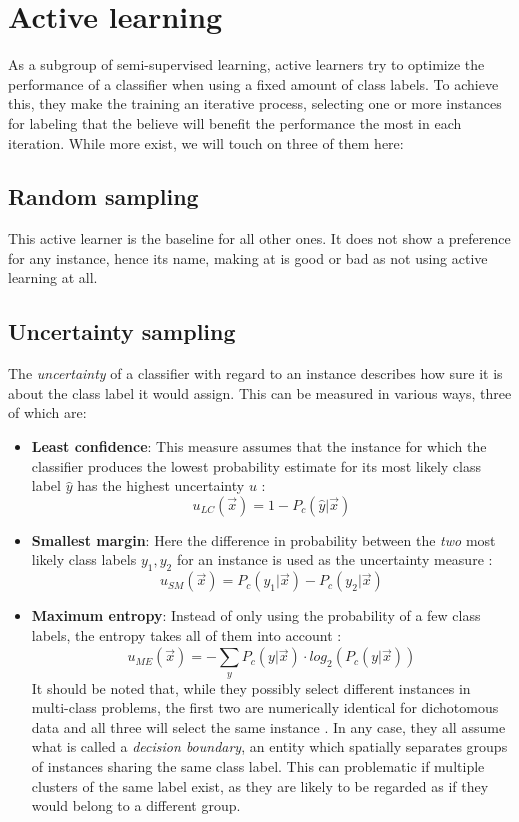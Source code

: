 \section{Active learning}
As a subgroup of semi-supervised learning, active learners try to optimize the performance of a classifier when using a fixed amount of class labels. To achieve this, they make the training an iterative process, selecting one or more instances for labeling that the believe will benefit the performance the most in each iteration. While more exist, we will touch on three of them here:

\subsection{Random sampling}
This active learner is the baseline for all other ones. It does not show a preference for any instance, hence its name, making at is good or bad as not using active learning at all.

\subsection{Uncertainty sampling}
The \textit{uncertainty} of a classifier with regard to an instance describes how sure it is about the class label it would assign. This can be measured in various ways, three of which are:

\begin{itemize}
\item \textbf{Least confidence}:
This measure assumes that the instance for which the classifier produces the lowest probability estimate for its most likely class label $\hat{y}$ has the highest uncertainty $u$ \cite{CulottaEtAl2004}:
\begin{equation}
u_{LC}(\vec{x}) = 1 - P_c(\hat{y} | \vec{x})
\end{equation}
\item \textbf{Smallest margin}:
Here the difference in probability between the \textit{two} most likely class labels $y_1, y_2$ for an instance is used as the uncertainty measure \cite{SchefferEtAl2001}:
\begin{equation}
u_{SM}(\vec{x}) = P_c(y_1 | \vec{x}) - P_c(y_2 | \vec{x})
\end{equation}
\item \textbf{Maximum entropy}:
Instead of only using the probability of a few class labels, the entropy takes all of them into account \cite{DaganEtAl1995}:
\begin{equation}
u_{ME}(\vec{x}) = -\sum_{y}^{} P_c(y | \vec{x}) \cdot log_2(P_c(y | \vec{x}))
\end{equation}
It should be noted that, while they possibly select different instances in multi-class problems, the first two are numerically identical for dichotomous data and all three will select the same instance \cite{ZhuEtAl2008}. In any case, they all assume what is called a \textit{decision boundary}, an entity which spatially separates groups of instances sharing the same class label. This can problematic if multiple clusters of the same label exist, as they are likely to be regarded as if they would belong to a different group.
\end{itemize}

